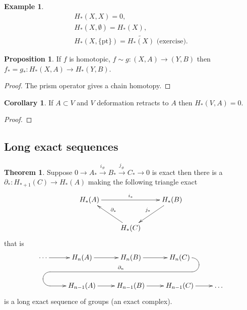 \documentclass[12pt]{article}
\theoremstyle{definition}
\newtheorem*{thm}{Theorem}
\newtheorem*{cor}{Corollary}
\newtheorem*{prop}{Proposition}
\theoremstyle{definition}
\newtheorem*{ex}{Example}
\renewcommand{\H}{H_*}
\begin{document}
\begin{ex}
\begin{align*}
\H(X,X) = 0,\\
\H(X,\emptyset) = \H(X),\\
\H(X,\{\mathrm{pt}\}) = \tilde{\H(X)} \text{ (exercise)}.
\end{align*}
\end{ex}

\begin{prop}
If $f$ is homotopic, $f\sim g\colon (X,A) \to (Y,B)$ then $f_* = g_*\colon\H(X,A) \to \H(Y,B)$.
\end{prop}
\begin{proof}
The prism operator gives a chain homotopy.
\end{proof}
\begin{cor}
If $A \subset V$ and $V$ deformation retracts to $A$ then $\H(V,A) = 0$.
\end{cor}
\begin{proof}

\end{proof}

\subsection{Long exact sequences}
\begin{thm}
Suppose $ 0\to A_* \xrightarrow{i_\#} B_* \xrightarrow{j_\#} C_* \to 0$ is exact then there is a $\partial_*\colon H_{* + 1}(C) \to H_*(A)$ making the following triangle exact
\[
\xymatrix
{
 \H(A) \ar[rr]^{i_*}& &\H(B)\ar[dl]_{j_*} \\
 &\H(C) \ar[ul]_{\partial_*}&
}
\]
that is
\[
\xymatrix{ \cdots\ar[r] & H_n(A) \ar[r]&
H_n(B) \ar[r] & H_n(C)\ar `r[d] `[l]
`[llld]_{\partial_n} `[dll] [dll]\\
& H_{n-1}(A) \ar[r] & H_{n-1}(B)
\ar[r] & H_{n-1}(C)\ar[r] & {\dots} }
\]
is a long exact sequence of groups (an exact complex).
\end{thm}
\end{document}

